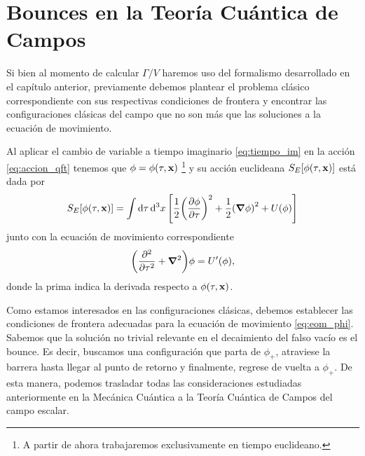 \section{Bounces en la Teoría Cuántica de Campos}

Si bien al momento de calcular $\Gamma/V$ haremos uso del formalismo desarrollado en el capítulo anterior,
previamente debemos plantear el problema clásico correspondiente con sus respectivas condiciones de frontera y encontrar 
las configuraciones clásicas del campo que no son más que las soluciones a la ecuación de movimiento.  

Al aplicar el cambio de variable a tiempo imaginario \eqref{eq:tiempo_im} en la acción \eqref{eq:accion_qft} tenemos que $\phi = \phi\qty(\tau, \vb{x})$ \footnote{A partir de ahora trabajaremos exclusivamente en tiempo euclideano. 
} 
y su acción euclideana $S_E\qty[\phi\qty(\tau, \vb{x})]$ está dada por
\begin{equation}
S_E\qty[\phi\qty(\tau, \vb{x})] = \int \dd{\tau} \dd[3]{x} \qty[\frac{1}{2}\qty(\pdv{\phi}{\tau})^2 + \frac{1}{2}\qty(\grad{\phi})^2 + U\qty(\phi)]
\end{equation}
junto con la ecuación de movimiento correspondiente
\begin{equation} \label{eq:eom_phi}
\qty(\pdv[2]{\tau} + \grad{}^2)\phi = U'\qty(\phi),
\end{equation}
donde la prima indica la derivada respecto a $\phi\qty(\tau, \vb{x})$. 

Como estamos interesados en las configuraciones clásicas,
debemos establecer las condiciones de frontera adecuadas para la ecuación de movimiento \eqref{eq:eom_phi}. Sabemos que la solución no trivial relevante en el decaimiento del falso vacío es el bounce. Es decir, buscamos una configuración que parta de $\phi_+$, atraviese la barrera hasta llegar al punto de retorno y finalmente, regrese de vuelta a $\phi_+$.  De esta manera, podemos trasladar todas las consideraciones estudiadas anteriormente en la Mecánica Cuántica a la Teoría Cuántica de Campos del campo escalar. 

